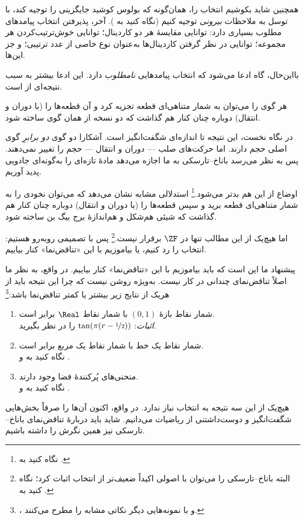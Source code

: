 \documentclass[../../../include/open-logic-section]{subfiles}
\begin{document}

همچنین شاید بکوشیم انتخاب را، همان‌گونه که بولوس کوشید جایگزینی را
توجیه کند، با توسل به ملاحظات \emph{بیرونی} توجیه کنیم (نگاه کنید
به ). آخر، پذیرفتن انتخاب پیامدهای
مطلوب بسیاری دارد: توانایی مقایسهٔ هر دو کاردینال؛ توانایی
خوش‌ترتیب‌کردن هر مجموعه؛ توانایی در نظر گرفتن کاردینال‌ها به‌عنوان
نوع خاصی از عدد ترتیبی؛ و جز این‌ها.

بااین‌حال، گاه ادعا می‌شود که انتخاب پیامدهایی \emph{نامطلوب} دارد.
این ادعا بیشتر به سبب نتیجه‌ای از \cite{BanachTarski1924} است.

\begin{thm}
هر گوی را می‌توان به شمار متناهی‌ای قطعه تجزیه کرد و آن قطعه‌ها را
(با دوران و انتقال) دوباره چنان کنار هم گذاشت که دو نسخه از همان
گوی ساخته شود.
\end{thm}
\noindent
در نگاه نخست، این نتیجه تا اندازه‌ای شگفت‌انگیز است. آشکارا دو گوی
\emph{دو برابرِ} گوی اصلی حجم دارند. اما حرکت‌های صلب — دوران و
انتقال — حجم را تغییر نمی‌دهند. پس به نظر می‌رسد باناخ--تارسکی به
ما اجازه می‌دهد مادهٔ تازه‌ای را به‌گونه‌ای جادویی پدید آوریم.

اوضاع از این هم بدتر می‌شود.\footnote{نگاه کنید به
\citet[Theorem 3.12]{Wagon2016}.} استدلالی مشابه نشان می‌دهد که
می‌توان نخودی را به شمار متناهی‌ای قطعه برید و سپس قطعه‌ها را (با
دوران و انتقال) دوباره چنان کنار هم گذاشت که شیئی هم‌شکل و
هم‌اندازهٔ برج بیگ بن ساخته شود.

اما هیچ‌یک از این مطالب تنها در $\ZF$ برقرار نیست.\footnote{البته
باناخ--تارسکی را می‌توان با اصولی اکیداً ضعیف‌تر از انتخاب اثبات
کرد؛ نگاه کنید به \citet[303]{Wagon2016}.} پس با تصمیمی روبه‌رو
هستیم: انتخاب را رد کنیم، یا بیاموزیم با این «تناقض‌نما» کنار
بیاییم.

پیشنهاد ما این است که باید بیاموزیم با این «تناقض‌نما» کنار بیاییم.
در واقع، به نظر ما اصلاً تناقض‌نمای چندانی در کار نیست. به‌ویژه روشن
نیست که چرا این نتیجه باید از هریک از نتایج زیر بیشتر یا کمتر
تناقض‌نما باشد:\footnote{\citet[276--7]{Potter2004}،
\citet[16]{Weston2003} و \citet[31, 308--9]{Wagon2016} با
نمونه‌هایی دیگر نکاتی مشابه را مطرح می‌کنند.}
\begin{enumerate}
	\item شمار نقاط بازهٔ $(0,1)$ با شمار نقاط $\Real$ برابر است.
	\\\emph{اثبات}: $\tan(\pi(r-\nicefrac{1}{2}))$ را در نظر بگیرید.
	\item شمار نقاط یک خط با شمار نقاط یک مربع برابر است.
	\\نگاه کنید به  و
	.
	\item منحنی‌های پُرکنندهٔ فضا وجود دارند.
	\\نگاه کنید به  و
	.
\end{enumerate}
هیچ‌یک از این سه نتیجه به انتخاب نیاز ندارد. در واقع، اکنون آن‌ها
را صرفاً بخش‌هایی شگفت‌انگیز و دوست‌داشتنی از ریاضیات می‌دانیم.
شاید باید دربارهٔ تناقض‌نمای باناخ--تارسکی نیز همین نگرش را داشته
باشیم.
\end{document}

